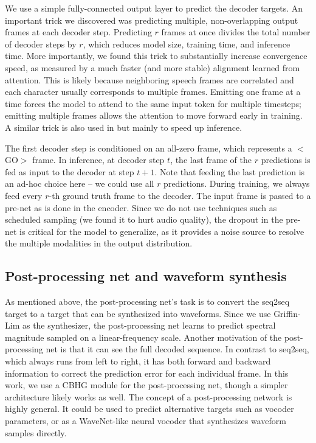 \documentclass{article} \usepackage{iclr2017_conference,times}
\begin{document}
We use a simple fully-connected output layer to predict the decoder targets. An important trick we discovered was predicting multiple, non-overlapping output frames at each decoder step.  Predicting $r$ frames at once divides the total number of decoder steps by $r$, which reduces model size, training time, and inference time.  More importantly, we found this trick to substantially increase convergence speed, as measured by a much faster (and more stable) alignment learned from attention. This is likely because neighboring speech frames are correlated and each character usually corresponds to multiple frames. Emitting one frame at a time forces the model to attend to the same input token for multiple timesteps; emitting multiple frames allows the attention to move forward early in training. A similar trick is also used in \cite{zen2016fast} but mainly to speed up inference.

The first decoder step is conditioned on an all-zero frame, which represents a $<$GO$>$ frame. In inference, at decoder step $t$, the last frame of the $r$ predictions is fed as input to the decoder at step $t+1$.  Note that feeding the last prediction is an ad-hoc choice here -- we could use all $r$ predictions. During training, we always feed every $r$-th ground truth frame to the decoder. The input frame is passed to a pre-net as is done in the encoder. Since we do not use techniques such as scheduled sampling \citep{bengio2015scheduled} (we found it to hurt audio quality), the dropout in the pre-net is critical for the model to generalize, as it provides a noise source to resolve the multiple modalities in the output distribution.

\subsection{Post-processing net and waveform synthesis}
As mentioned above, the post-processing net's task is to convert the seq2seq target to a target that can be synthesized into waveforms. Since we use Griffin-Lim as the synthesizer, the post-processing net learns to predict spectral magnitude sampled on a linear-frequency scale. Another motivation of the post-processing net is that it can see the full decoded sequence. In contrast to seq2seq, which always runs from left to right, it has both forward and backward information to correct the prediction error for each individual frame. In this work, we use a CBHG module for the post-processing net, though a simpler architecture likely works as well. The concept of a post-processing network is highly general. It could be used to predict alternative targets such as vocoder parameters, or as a WaveNet-like neural vocoder \citep{van2016wavenet, mehri2016samplernn, arik2017deep} that synthesizes waveform samples directly.
\end{document}
